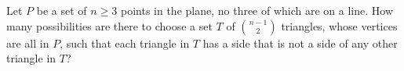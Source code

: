 Let $P$ be a set of $n\ge 3$ points in the plane, no three of which are on a line. How many possibilities are there to choose a set $T$ of $\binom{n-1}{2}$ triangles, whose vertices are all in $P$,  such that each triangle in $T$ has a side that is not a side of any other triangle in $T$?